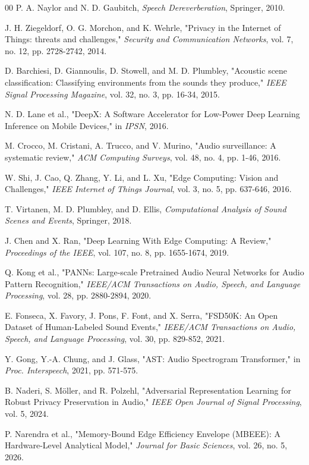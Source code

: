 \documentclass[conference]{IEEEtran}
\begin{document}
\begin{thebibliography}{00}
 P. A. Naylor and N. D. Gaubitch, \textit{Speech Dereverberation}, Springer, 2010.

 J. H. Ziegeldorf, O. G. Morchon, and K. Wehrle, "Privacy in the Internet of Things: threats and challenges," \textit{Security and Communication Networks}, vol. 7, no. 12, pp. 2728-2742, 2014.

 D. Barchiesi, D. Giannoulis, D. Stowell, and M. D. Plumbley, "Acoustic scene classification: Classifying environments from the sounds they produce," \textit{IEEE Signal Processing Magazine}, vol. 32, no. 3, pp. 16-34, 2015.

 N. D. Lane et al., "DeepX: A Software Accelerator for Low-Power Deep Learning Inference on Mobile Devices," in \textit{IPSN}, 2016.

 M. Crocco, M. Cristani, A. Trucco, and V. Murino, "Audio surveillance: A systematic review," \textit{ACM Computing Surveys}, vol. 48, no. 4, pp. 1-46, 2016.

 W. Shi, J. Cao, Q. Zhang, Y. Li, and L. Xu, "Edge Computing: Vision and Challenges," \textit{IEEE Internet of Things Journal}, vol. 3, no. 5, pp. 637-646, 2016.

 T. Virtanen, M. D. Plumbley, and D. Ellis, \textit{Computational Analysis of Sound Scenes and Events}, Springer, 2018.

 J. Chen and X. Ran, "Deep Learning With Edge Computing: A Review," \textit{Proceedings of the IEEE}, vol. 107, no. 8, pp. 1655-1674, 2019.

 Q. Kong et al., "PANNs: Large-scale Pretrained Audio Neural Networks for Audio Pattern Recognition," \textit{IEEE/ACM Transactions on Audio, Speech, and Language Processing}, vol. 28, pp. 2880-2894, 2020.

 E. Fonseca, X. Favory, J. Pons, F. Font, and X. Serra, "FSD50K: An Open Dataset of Human-Labeled Sound Events," \textit{IEEE/ACM Transactions on Audio, Speech, and Language Processing}, vol. 30, pp. 829-852, 2021.

 Y. Gong, Y.-A. Chung, and J. Glass, "AST: Audio Spectrogram Transformer," in \textit{Proc. Interspeech}, 2021, pp. 571-575.

 B. Naderi, S. Möller, and R. Polzehl, "Adversarial Representation Learning for Robust Privacy Preservation in Audio," \textit{IEEE Open Journal of Signal Processing}, vol. 5, 2024.

 P. Narendra et al., "Memory-Bound Edge Efficiency Envelope (MBEEE): A Hardware-Level Analytical Model," \textit{Journal for Basic Sciences}, vol. 26, no. 5, 2026.

\end{thebibliography}
\end{document}
